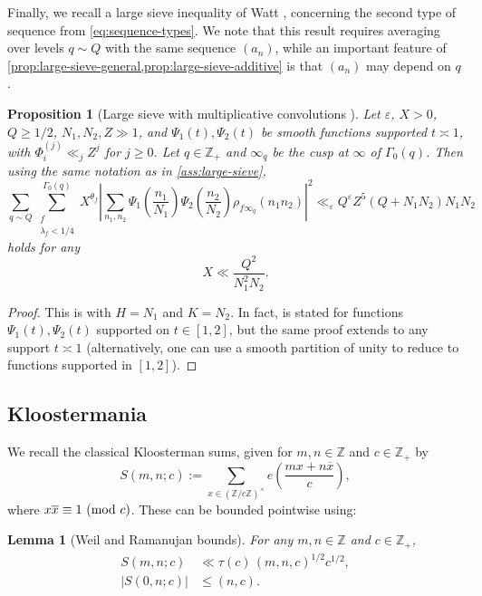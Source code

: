 \documentclass[reqno,11pt]{amsart}
\newtheorem{proposition}[theorem]{Proposition}
\newtheorem{lemma}[theorem]{Lemma}
\theoremstyle{remark}
\numberwithin{equation}{section}
\newcommand{\Z}{\mathbb{Z}}
\newcommand{\eps}{\varepsilon}
\renewcommand{\bar}{\overline}
\renewcommand{\pmod}[1]{\ (\textnormal{mod } #1)}
\begin{document}
Finally, we recall a large sieve inequality of Watt \cite{watt1995kloosterman}, 
concerning the second type of sequence from \cref{eq:sequence-types}. We note that this result requires averaging over levels $q \sim Q$ with the same sequence $(a_n)$, while an important feature of \cref{prop:large-sieve-general,prop:large-sieve-additive} is that $(a_n)$ may depend on $q$.

\begin{proposition}[Large sieve with multiplicative convolutions \cite{watt1995kloosterman}] \label{prop:large-sieve-multiplicative}
Let $\eps$, $X > 0$, $Q \ge 1/2$, $N_1, N_2, Z \gg 1$, and $\Psi_1(t), \Psi_2(t)$ be smooth functions supported $t \asymp 1$, with $\Phi_i^{(j)} \ll_j Z^j$ for $j \ge 0$. Let $q \in \Z_+$ and $\infty_q$ be the cusp at $\infty$ of $\Gamma_0(q)$. Then using the same notation as in \cref{ass:large-sieve},
\[
    \sum_{q \sim Q} \sum_{\substack{f \\ \lambda_f < 1/4}}^{\Gamma_0(q)}
    X^{\theta_f} 
    \left\vert 
    \sum_{n_1, n_2} \Psi_1\left(\frac{n_1}{N_1}\right) \Psi_2\left(\frac{n_2}{N_2}\right) \rho_{f\infty_q}(n_1 n_2)
    \right\vert^2 
    \ll_\eps 
    Q^\eps Z^5
    \left(Q + N_1 N_2\right) N_1 N_2
\]
holds for any
\begin{equation} \label{eq:watt-saving}
    X \ll \frac{Q^2}{N_1^2 N_2}.
\end{equation}
\end{proposition}

\begin{proof}
This is \cite[Theorem 2]{watt1995kloosterman} with $H = N_1$ and $K = N_2$. In fact, \cite[Theorem 2]{watt1995kloosterman} is stated for functions $\Psi_1(t), \Psi_2(t)$ supported on $t \in [1, 2]$, but the same proof extends to any support $t \asymp 1$ (alternatively, one can use a smooth partition of unity to reduce to functions supported in $[1, 2]$).
\end{proof}


\subsection{Kloostermania} \label{subsec:sums-kloosterman}

We recall the classical Kloosterman sums, given for $m, n \in \Z$ and $c \in \Z_+$ by
\[
    S(m, n; c) := \sum_{x \in (\Z/c\Z)^\times} e\left(\frac{mx + n\bar{x}}{c}\right),
\]
where $x\bar{x} \equiv 1 \pmod{c}$. These can be bounded pointwise using:
\begin{lemma}[Weil and Ramanujan bounds] \label{lem:weil}
For any $m, n \in \Z$ and $c \in \Z_+$,
\[
\begin{aligned}
    S(m, n; c) &\ll \tau(c)\, (m, n, c)^{1/2} c^{1/2},
    \\
    |S(0, n; c)| &\le (n, c).
\end{aligned}
\]
\end{lemma}
\end{document}
